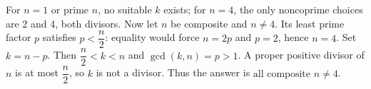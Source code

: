 For $n=1$ or prime $n$, no suitable $k$ exists; for $n=4$, the only noncoprime choices are 2 and 4, both divisors. Now let $n$ be composite and $n\ne4$. Its least prime factor $p$ satisfies $p<\dfrac{n}{2}$: equality would force $n=2p$ and $p=2$, hence $n=4$. Set $k=n-p$. Then $\dfrac{n}{2}<k<n$ and $\gcd(k,n)=p>1$. A proper positive divisor of $n$ is at most $\dfrac{n}{2}$, so $k$ is not a divisor. Thus the answer is $\boxed{\text{all composite }n\ne4}$.
